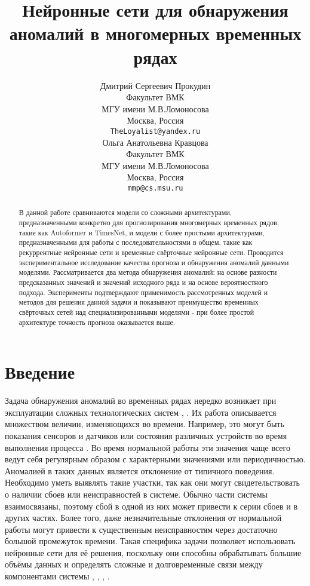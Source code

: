 \documentclass{article}
\title{Нейронные сети для обнаружения аномалий в многомерных временных рядах}
\author{  Дмитрий Сергеевич Прокудин \\
	Факультет ВМК \\
    МГУ имени М.В.Ломоносова \\
	Москва, Россия \\
	\texttt{TheLoyalist@yandex.ru} \\
	\And
	Ольга Анатольевна Кравцова \\
	Факультет ВМК \\
    МГУ имени М.В.Ломоносова \\
	Москва, Россия \\
	\texttt{mmp@cs.msu.ru}  \\
}
\date{}
\begin{document}
\maketitle

\begin{abstract}
    
В данной работе сравниваются модели со сложными архитектурами, предназначенными конкретно для прогнозирования многомерных временных рядов, такие как Autoformer и TimesNet, и модели с более простыми архитектурами, предназначенными для работы с последовательностями в общем, такие как рекуррентные нейронные сети и временные свёрточные нейронные сети. Проводится экспериментальное исследование качества прогноза и обнаружения аномалий данными моделями. Рассматривается два метода обнаружения аномалий: на основе разности предсказанных значений и значений исходного ряда и на основе вероятностного подхода. Эксперименты подтверждают применимость рассмотренных моделей и методов для решения данной задачи и показывают преимущество временных свёрточных сетей над специализированными моделями - при более простой архитектуре точность прогноза оказывается выше. 
\end{abstract}



\section{Введение}
Задача обнаружения аномалий во временных рядах нередко возникает при эксплуатации сложных технологических систем \cite{darban2022deep}, \cite{shalyga2018anomaly}. Их работа описывается множеством величин, изменяющихся во времени. Например, это могут быть показания сенсоров и датчиков или состояния различных устройств во время выполнения процесса \cite{shalyga2018anomaly}. Во время нормальной работы эти значения чаще всего ведут себя регулярным образом с характерными значениями или периодичностью. Аномалией в таких данных является отклонение от типичного поведения. Необходимо уметь выявлять такие участки, так как они могут свидетельствовать о наличии сбоев или неисправностей в системе. Обычно части системы взаимосвязаны, поэтому сбой в одной из них может привести к серии сбоев и в других частях. Более того, даже незначительные отклонения от нормальной работы могут привести к существенным неисправностям через достаточно большой промежуток времени. Такая специфика задачи позволяет использовать нейронные сети для её решения, поскольку они способны обрабатывать большие объёмы данных и определять сложные и долговременные связи между компонентами системы \cite{darban2022deep}, \cite{shalyga2018anomaly}, \cite{kravchik2019efficient}, \cite{nie2023time}.
\end{document}
